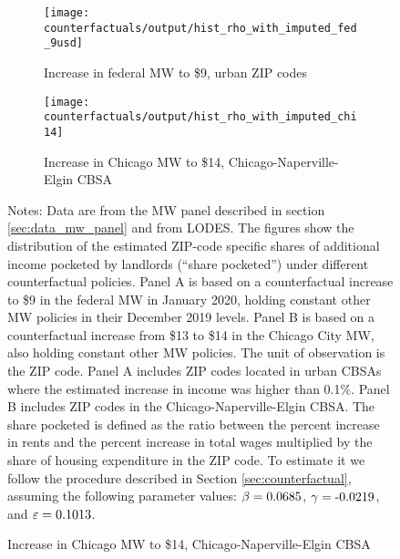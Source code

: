 \begin{figure}[h!]
    \centering
    \caption{Estimated shares pocketed by landlords under counterfactual MW policies}
    \label{fig:cf_hist_shares}

    \begin{subfigure}{0.75\textwidth} \centering
        \caption{Increase in federal MW to \$9, urban ZIP codes}
        \texttt{[image: counterfactuals/output/hist\_rho\_with\_imputed\_fed\_9usd]}
    \end{subfigure}

    \begin{subfigure}{0.75\textwidth} \centering
        \caption{Increase in Chicago MW to \$14, Chicago-Naperville-Elgin CBSA}
        \texttt{[image: counterfactuals/output/hist\_rho\_with\_imputed\_chi14]}
    \end{subfigure}

    \begin{minipage}{.95\textwidth} \footnotesize
        \vspace{3mm}
        Notes:
        Data are from the MW panel described in section \ref{sec:data_mw_panel} 
        and from LODES.
        The figures show the distribution of the estimated ZIP-code specific
        shares of additional income pocketed by landlords (``share pocketed'')
        under different counterfactual policies.
        Panel A is based on a counterfactual increase to \$9 in the 
        federal MW in January 2020, holding constant other MW policies in their 
        December 2019 levels.
        Panel B is based on a counterfactual increase from \$13 to \$14 in the 
        Chicago City MW, also holding constant other MW policies.
        The unit of observation is the ZIP code.
        Panel A includes ZIP codes located in urban CBSAs where the estimated 
        increase in income was higher than 0.1\%.
        Panel B includes ZIP codes in the Chicago-Naperville-Elgin CBSA.
        The share pocketed is defined as the ratio between the percent increase 
        in rents and the percent increase in total wages multiplied by the share 
        of housing expenditure in the ZIP code.
        To estimate it we follow the procedure described in Section 
        \ref{sec:counterfactual}, assuming the following parameter values: 
        $\beta = \textnormal{0.0685}$, $\gamma = \textnormal{-0.0219}$, and $\varepsilon = \textnormal{0.1013}$.
    \end{minipage}
\end{figure}
